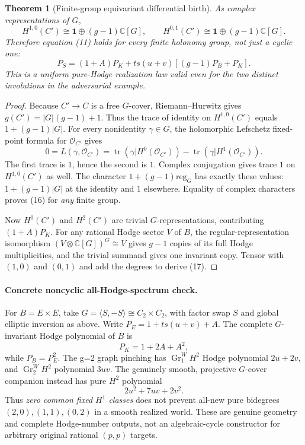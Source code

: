 \documentclass[11pt]{article}
\newtheorem{theorem}{Theorem}
\begin{document}
\begin{theorem}[Finite-group equivariant differential birth]
As complex representations of $G$,
\[
 \boxed{\quad H^{1,0}(C')\cong
 \mathbf1\oplus(g-1)\mathbb C[G],\qquad
 H^{0,1}(C')\cong
 \mathbf1\oplus(g-1)\mathbb C[G].\quad}                \tag{16}
\]
Therefore equation (11) holds for \emph{every
finite holonomy group}, not just a cyclic one:
\[
\boxed{\quad
P_{S}=(1+A)P_K+ts(u+v)[(g-1)P_B+P_K].
\quad}                                               \tag{17}
\]
This is a uniform pure-Hodge realization law
valid even for the two distinct involutions in
the adversarial example.
\end{theorem}
\begin{proof}
Because $C'\to C$ is a free $G$-cover,
Riemann--Hurwitz gives
$g(C')=|G|(g-1)+1$.  Thus the trace of identity
on $H^{1,0}(C')$ equals $1+(g-1)|G|$.
For every nonidentity $\gamma\in G$,
the holomorphic Lefschetz fixed-point formula
for $\mathcal O_{C'}$ gives
\[
  0=L(\gamma,\mathcal O_{C'})
   =\operatorname{tr}(\gamma|H^0(\mathcal O_{C'}))
     -\operatorname{tr}(\gamma|H^1(\mathcal O_{C'})).
\]
The first trace is $1$, hence the second is $1$.
Complex conjugation gives trace $1$ on
$H^{1,0}(C')$ as well. The character
$1+(g-1)\mathrm{reg}_G$ has exactly these
values: $1+(g-1)|G|$ at the identity and $1$
elsewhere. Equality of complex characters proves
(16) for \emph{any} finite group.

Now $H^0(C')$ and $H^2(C')$ are trivial
$G$-representations, contributing $(1+A)P_K$.
For any rational Hodge sector $V$ of $B$,
the regular-representation isomorphism
$(V\otimes\mathbb C[G])^G\cong V$ gives
$g-1$ copies of its full Hodge multiplicities,
and the trivial summand gives one invariant
copy. Tensor with $(1,0)$ and $(0,1)$
and add the degrees to derive (17).
\end{proof}

\paragraph{Concrete noncyclic all-Hodge-spectrum check.}
For $B=E\times E$, take $G=\langle S,-S\rangle
\cong C_2\times C_2$, with factor swap $S$
and global elliptic inversion as above.
Write $P_E=1+ts(u+v)+A$.  The complete
$G$-invariant Hodge polynomial of $B$ is
\[
 P_K=1+2A+A^2,
\]
while $P_B=P_E^2$.  The g=2 graph pinching has
$\operatorname{Gr}^W_1H^2$ Hodge polynomial
$2u+2v$, and $\operatorname{Gr}^W_2H^2$
polynomial $3uv$.  The genuinely smooth,
projective $G$-cover companion instead has
pure $H^2$ polynomial
\[
 \boxed{2u^2+7uv+2v^2.}
\]
Thus \emph{zero common fixed $H^1$ classes}
does not prevent all-new pure bidegrees
$(2,0),(1,1),(0,2)$ in a smooth realized
world.  These are genuine geometry and
complete Hodge-number outputs, not an
algebraic-cycle constructor for arbitrary
original rational $(p,p)$ targets.
\end{document}
